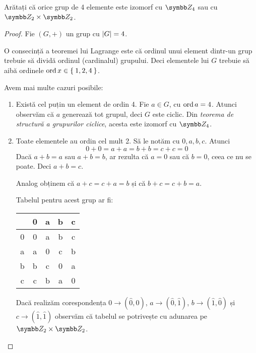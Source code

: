 \begin{exercise}
Arătați că orice grup de 4 elemente este izomorf cu \(\integersmod{4}\) sau cu \(\integersmod{2} \times \integersmod{2}\).
\end{exercise}
\begin{proof}
Fie \((G, +)\) un grup cu \(\left\lvert G \right\rvert = 4\).

O consecință a teoremei lui Lagrange este că ordinul unui element dintr-un grup trebuie să dividă ordinul (cardinalul) grupului. Deci elementele lui \(G\) trebuie să aibă ordinele \(\operatorname{ord} x \in \Set{1, 2, 4}\).

Avem mai multe cazuri posibile:
\begin{enumerate}
    \item Există cel puțin un element de ordin 4. Fie \(a \in G\), cu \(\operatorname{ord} a = 4\). Atunci observăm că \(a\) generează tot grupul, deci \(G\) este ciclic. Din \emph{teorema de structură a grupurilor ciclice}, acesta este izomorf cu \(\integersmod{4}\).

    \item Toate elementele au ordin cel mult 2. Să le notăm cu \(0, a, b, c\). Atunci
    \[
        0 + 0 = a + a = b + b = c + c = 0
    \]
    Dacă \(a + b = a\) sau \(a + b = b\), ar rezulta că \(a = 0\) sau că \(b = 0\), ceea ce nu se poate. Deci \(a + b = c\).

    Analog obținem că \(a + c = c + a = b\) și că \(b + c = c + b = a\).

    Tabelul pentru acest grup ar fi:
    \begin{center}
        \begin{tabular}{C|C|C|C|C}
          & 0 & a & b & c \\
         & 0 & a & b & c \\
        \hline
        a & a & 0 & c & b \\
        \hline
        b & b & c & 0 & a \\
        \hline
        c & c & b & a & 0 \\
        \end{tabular}
    \end{center}

    Dacă realizăm corespondența \(0 \to (\widehat{0}, \widehat{0})\), \(a \to (\widehat{0}, \widehat{1})\), \(b \to (\widehat{1}, \widehat{0})\) și \(c \to (\widehat{1}, \widehat{1})\) observăm că tabelul se potrivește cu adunarea pe \(\integersmod{2} \times \integersmod{2}\).
\end{enumerate}

\end{proof}

